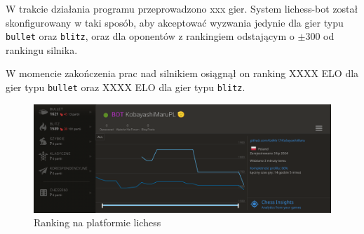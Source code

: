 
W trakcie działania programu przeprowadzono xxx gier.
System lichess-bot został skonfigurowany w taki sposób, aby akceptować wyzwania jedynie dla gier typu \texttt{bullet} oraz \texttt{blitz}, oraz dla oponentów z rankingiem odstającym o $\pm300$ od rankingu silnika.

W momencie zakończenia prac nad silnikiem osiągnął on ranking XXXX ELO dla gier typu \texttt{bullet} oraz XXXX ELO dla gier typu \texttt{blitz}.
\begin{figure}[ht]
    \centering
    \includegraphics[width=1\linewidth]{rozdzialy/rozdzial03/2_porownanie-z-innymi-silnikami/rysunki/lichess-ranking}
    \caption{Ranking na platformie lichess}
    \label{fig:lichess-ranking}
\end{figure}